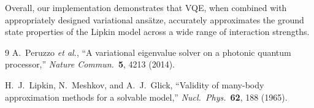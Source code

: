 \documentclass[11pt]{article}
\begin{document}
Overall, our implementation demonstrates that VQE, when combined with appropriately designed variational ans\"atze, accurately approximates the ground state properties of the Lipkin model across a wide range of interaction strengths.

\begin{thebibliography}{9}
A.~Peruzzo \emph{et al.}, ``A variational eigenvalue solver on a photonic quantum processor,'' \emph{Nature Commun.}\ \textbf{5}, 4213 (2014).

H.~J.~Lipkin, N.~Meshkov, and A.~J.~Glick, ``Validity of many-body approximation methods for a solvable model,'' \emph{Nucl.\ Phys.}\ \textbf{62}, 188 (1965).
\end{thebibliography}
\end{document}
